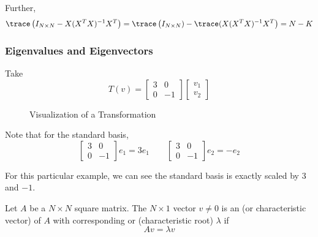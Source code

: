 \documentclass{article}
\begin{document}
Further,
\[
  \trace\left(I_{N \times N} - X (X^T X)^{-1} X^T\right)
  =
  \trace\left(I_{N \times N}) - \trace(X (X^T X)^{-1} X^T\right)
  =
  N - K
\]

\subsubsection{Eigenvalues and Eigenvectors}
\label{ssub:eigenvalues_and_eigenvectors}

Take
\[
  T(v) =
  \left[\begin{matrix}
    3 & 0 \\ 0 & -1
  \end{matrix}\right]
  \left[\begin{matrix}
    v_1 \\ v_2
  \end{matrix}\right]
\]

\begin{figure}[!ht]
  \centering
  \caption{Visualization of a Transformation}
  \label{fig:visualization_of_a_transformation}
\end{figure}

Note that for the standard basis,
\[
  \left[\begin{matrix}
    3 & 0 \\ 0 & -1
  \end{matrix}\right]
  e_1
  =
  3e_1
  \quad\quad
  \left[\begin{matrix}
    3 & 0 \\ 0 & -1
  \end{matrix}\right]
  e_2
  =
  -e_2
\]

For this particular example, we can see the standard basis is exactly scaled by $3$ and $-1$.
\begin{definition}
  Let $A$ be a $N \times N$ square matrix. The $N \times 1$ vector $v \ne 0$ is an  (or characteristic vector) of $A$ with corresponding  or (characteristic root) $\lambda$ if
  \[
    A v = \lambda v
  \]
\end{definition}
\end{document}
